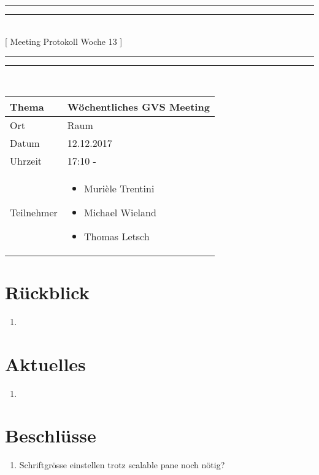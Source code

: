 \documentclass[11pt, a4paper,oneside]{scrartcl}
\begin{document}
	\centering
	\rule{\textwidth}{1.6pt}\vspace*{-\baselineskip}\vspace*{2pt} %
	\rule{\textwidth}{0.4pt}\\[\baselineskip] %
	{\LARGE [ Meeting Protokoll Woche 13 ]}\\[0.2\baselineskip] %
	\rule{\textwidth}{0.4pt}\vspace*{-\baselineskip}\vspace{3.2pt} %
	\rule{\textwidth}{1.6pt}\\[2\baselineskip] %
	
	\begin{tabu} to \linewidth {l X }
		\toprule
		\textbf{Thema} & \textbf{Wöchentliches GVS Meeting} \\
		\midrule
		Ort & Raum  \\
		Datum & 12.12.2017  \\
		Uhrzeit &  17:10 -  \\
		Teilnehmer & 
		\begin{minipage}[t]{\textwidth}
			\begin{itemize}
				\item Murièle Trentini
				\item Michael Wieland
				\item Thomas Letsch
			\end{itemize}
		\end{minipage}
		\\
		\bottomrule
	\end{tabu}
	
	
	\section{Rückblick}
	\begin{enumerate}
		\item 
	\end{enumerate}
	
	\section{Aktuelles}
	\begin{enumerate}
		\item 
	\end{enumerate} 
	
	\section{Beschlüsse}
	\begin{enumerate}
		\item Schriftgrösse einstellen trotz scalable pane noch nötig?
	\end{enumerate}
\end{document}
